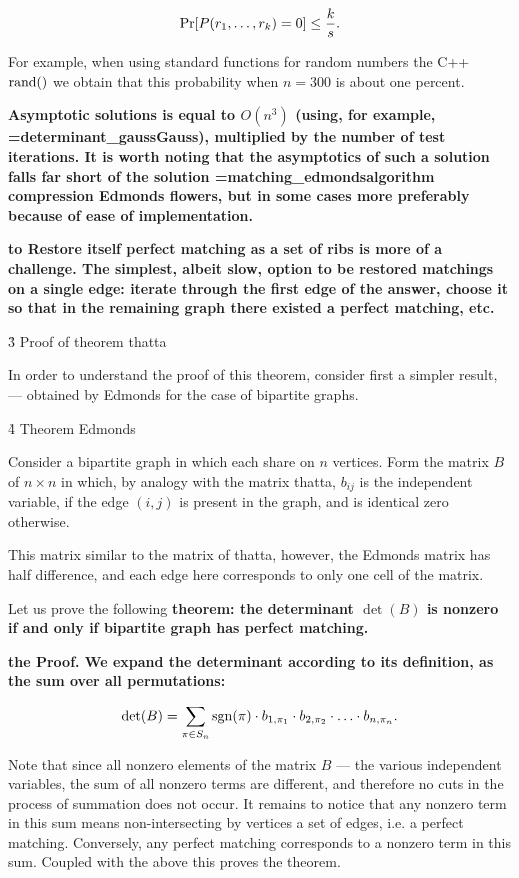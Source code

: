 $$ {\rm Pr}[P(r_1,\ldots,r_k)=0] \le \frac{k}{s}. $$

For example, when using standard functions for random numbers the C++ $\rm rand()$ we obtain that this probability when $n=300$ is about one percent.

\bf{Asymptotic} solutions is equal to $O(n^3)$ (using, for example, \algohref=determinant_gauss{Gauss}), multiplied by the number of test iterations. It is worth noting that the asymptotics of such a solution falls far short of the solution \algohref=matching_edmonds{algorithm compression Edmonds flowers}, but in some cases more preferably because of ease of implementation.

\bf{to Restore} itself perfect matching as a set of ribs is more of a challenge. The simplest, albeit slow, option to be restored matchings on a single edge: iterate through the first edge of the answer, choose it so that in the remaining graph there existed a perfect matching, etc.


\h3{ Proof of theorem thatta }

In order to understand the proof of this theorem, consider first a simpler result, --- obtained by Edmonds for the case of bipartite graphs.


\h4{ Theorem Edmonds }

Consider a bipartite graph in which each share on $n$ vertices. Form the matrix $B$ of $n \times n$ in which, by analogy with the matrix thatta, $b_{ij}$ is the independent variable, if the edge $(i,j)$ is present in the graph, and is identical zero otherwise.

This matrix similar to the matrix of thatta, however, the Edmonds matrix has half difference, and each edge here corresponds to only one cell of the matrix.

Let us prove the following \bf{theorem}: the determinant $\det(B)$ is nonzero if and only if bipartite graph has perfect matching.

\bf{the Proof}. We expand the determinant according to its definition, as the sum over all permutations:

$$ \det(B) = \sum_{\pi \in S_n} {\rm sgn}(\pi) \cdot b_{1,\pi_1} \cdot b_{2,\pi_2} \cdot \ldots \cdot b_{n,\pi_n}. $$

Note that since all nonzero elements of the matrix $B$ --- the various independent variables, the sum of all nonzero terms are different, and therefore no cuts in the process of summation does not occur. It remains to notice that any nonzero term in this sum means non-intersecting by vertices a set of edges, i.e. a perfect matching. Conversely, any perfect matching corresponds to a nonzero term in this sum. Coupled with the above this proves the theorem.


